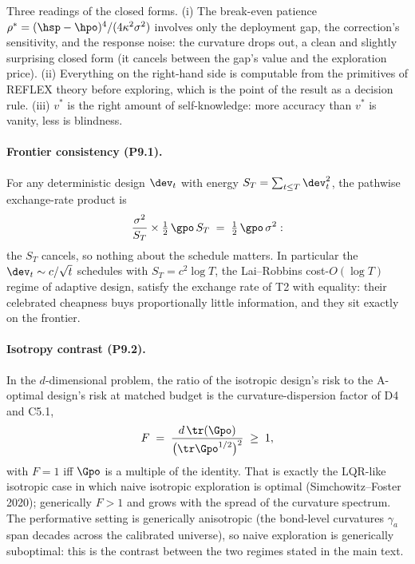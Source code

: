 Three readings of the closed forms. (i) The break-even patience
$\rho^{*} = (\hsp-\hpo)^4/(4\kappa^2\sigma^2)$ involves only the
deployment gap, the correction's sensitivity, and the response noise:
the curvature drops out, a clean and slightly surprising
closed form (it cancels between the gap's value and the exploration
price). (ii) Everything on the right-hand side is computable from the
primitives of REFLEX theory before exploring, which is the point of the
result as a decision rule. (iii) $v^{*}$ is the right amount of
self-knowledge: more accuracy than $v^{*}$ is vanity, less is blindness.

\paragraph{Frontier consistency (P9.1).}
For any deterministic design $\dev_t$ with energy
$S_T = \sum_{t\le T}\dev_t^2$, the pathwise exchange-rate product is
\begin{equation*}
\frac{\sigma^2}{S_T} \times \tfrac{1}{2}\,\gpo\, S_T
\;=\; \tfrac{1}{2}\,\gpo\,\sigma^2 :
\end{equation*}
the $S_T$ cancels, so nothing about the schedule matters. In particular
the $\dev_t \sim c/\sqrt{t}$ schedules with $S_T = c^2 \log T$, the
Lai--Robbins cost-$O(\log T)$ regime of adaptive design, satisfy the
exchange rate of T2 with equality: their celebrated cheapness buys
proportionally little information, and they sit exactly on the frontier.

\paragraph{Isotropy contrast (P9.2).}
In the $d$-dimensional problem, the ratio of the isotropic design's risk
to the A-optimal design's risk at matched budget is the
curvature-dispersion factor of D4 and C5.1,
\begin{equation*}
F \;=\; \frac{d\,\tr(\Gpo)}{\big(\tr \Gpo^{1/2}\big)^{2}} \;\ge\; 1,
\end{equation*}
with $F = 1$ iff $\Gpo$ is a multiple of the identity. That is exactly
the LQR-like isotropic case in which naive isotropic exploration is
optimal (Simchowitz--Foster 2020); generically $F > 1$ and grows with
the spread of the curvature spectrum. The performative setting is
generically anisotropic (the bond-level curvatures $\gamma_a$ span
decades across the calibrated universe), so naive exploration is
generically suboptimal: this is the contrast between the two regimes
stated in the main text.

